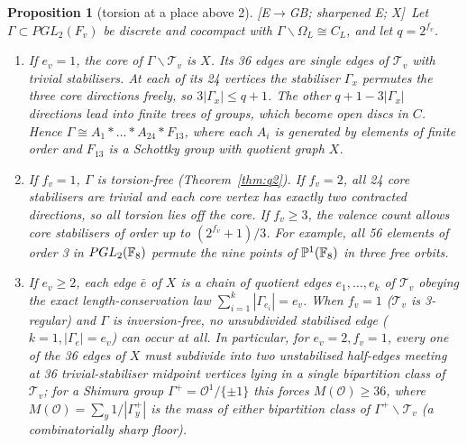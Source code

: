 \documentclass[11pt]{amsart}
\numberwithin{equation}{section}
\theoremstyle{plain}
\newtheorem{proposition}[theorem]{Proposition}
\theoremstyle{definition}\newtheorem{definition}[theorem]{Definition}
\theoremstyle{remark}\newtheorem{remark}[theorem]{Remark}
\newcommand{\ctag}[1]{\textup{\textsf{\scriptsize[#1]}}}
\begin{document}
\begin{proposition}[torsion at a place above 2]\label{prop:torsion}
\ctag{E$\to$GB; sharpened E; X}\ Let $\Gamma\subset PGL_2(F_v)$ be discrete and cocompact with $\Gamma\backslash\Omega_L\cong C_L$, and let $q=2^{f_v}$.
\begin{enumerate}[label=(\alph*),nosep]
\item If $e_v=1$, the core of $\Gamma\backslash\mathcal T_v$ is $X$. Its 36 edges are single edges of $\mathcal T_v$ with trivial stabilisers. At each of its 24 vertices the stabiliser $\Gamma_x$ permutes the three core directions freely, so $3|\Gamma_x|\le q+1$. The other $q+1-3|\Gamma_x|$ directions lead into finite trees of groups, which become open discs in $C$. Hence $\Gamma\cong A_1*\dots*A_{24}*F_{13}$, where each $A_i$ is generated by elements of finite order and $F_{13}$ is a Schottky group with quotient graph $X$.
\item If $f_v=1$, $\Gamma$ is torsion-free (Theorem~\ref{thm:q2}). If $f_v=2$, all 24 core stabilisers are trivial and each core vertex has exactly two contracted directions, so all torsion lies off the core. If $f_v\ge3$, the valence count allows core stabilisers of order up to $(2^{f_v}+1)/3$. For example, all 56 elements of order 3 in $PGL_2(\mathbb{F}_8)$ permute the nine points of $\mathbb P^1(\mathbb{F}_8)$ in three free orbits.
\item If $e_v\ge2$, each edge $\bar e$ of $X$ is a chain of quotient edges $e_1,\dots,e_k$ of $\mathcal T_v$ obeying the exact length-conservation law $\sum_{i=1}^k|\Gamma_{e_i}|=e_v$. When $f_v=1$ ($\mathcal T_v$ is 3-regular) and $\Gamma$ is inversion-free, no unsubdivided stabilised edge ($k=1,|\Gamma_e|=e_v$) can occur at all. In particular, for $e_v=2,f_v=1$, every one of the 36 edges of $X$ must subdivide into two unstabilised half-edges meeting at 36 trivial-stabiliser midpoint vertices lying in a single bipartition class of $\mathcal T_v$; for a Shimura group $\Gamma^+=\mathcal O^1/\{\pm1\}$ this forces $M(\mathcal O)\ge36$, where $M(\mathcal O)=\sum_y1/|\Gamma^+_y|$ is the mass of either bipartition class of $\Gamma^+\backslash\mathcal T_v$ (a combinatorially sharp floor).
\end{enumerate}
\end{proposition}
\end{document}
